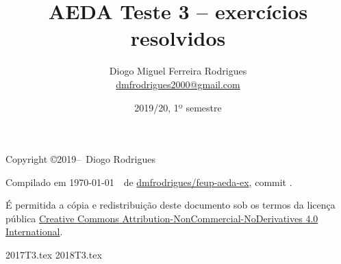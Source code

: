 \documentclass{aeda_test}
\title{AEDA Teste 3 -- exercícios resolvidos}
\author{Diogo Miguel Ferreira Rodrigues \\ \href{mailto:dmfrodrigues2000@gmail.com}{dmfrodrigues2000@gmail.com}}
\date{2019/20, 1º semestre}
\begin{document}
\maketitle
\begin{secondpage}
    Copyright \copyright 2019--\the\year\ Diogo Rodrigues\par
    \par
    \immediate{}
    Compilado em \today~\currenttime~de \href{https://github.com/dmfrodrigues/feup-aeda-ex}{dmfrodrigues/feup-aeda-ex}, commit \unskip.\par
    É permitida a cópia e redistribuição deste documento sob os termos da licença pública
    \href{https://creativecommons.org/licenses/by-nc-nd/4.0/}{Creative Commons Attribution-NonCommercial-NoDerivatives 4.0 International}.
\end{secondpage}
\frontmatter
\tableofcontents
\mainmatter
{2017T3.tex}
{2018T3.tex}
\end{document}
